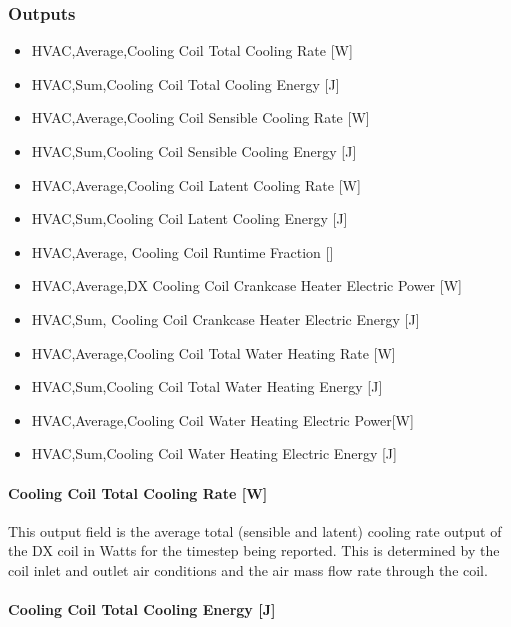 \subsubsection{Outputs}\label{outputs-24}

\begin{itemize}
\item
  HVAC,Average,Cooling Coil Total Cooling Rate {[}W{]}
\item
  HVAC,Sum,Cooling Coil Total Cooling Energy {[}J{]}
\item
  HVAC,Average,Cooling Coil Sensible Cooling Rate {[}W{]}
\item
  HVAC,Sum,Cooling Coil Sensible Cooling Energy {[}J{]}
\item
  HVAC,Average,Cooling Coil Latent Cooling Rate {[}W{]}
\item
  HVAC,Sum,Cooling Coil Latent Cooling Energy {[}J{]}
\item
  HVAC,Average, Cooling Coil Runtime Fraction {[]}
\item
  HVAC,Average,DX Cooling Coil Crankcase Heater Electric Power {[}W{]}
\item
  HVAC,Sum, Cooling Coil Crankcase Heater Electric Energy {[}J{]}
\item
  HVAC,Average,Cooling Coil Total Water Heating Rate {[}W{]}
\item
  HVAC,Sum,Cooling Coil Total Water Heating Energy {[}J{]}
\item
  HVAC,Average,Cooling Coil Water Heating Electric Power{[}W{]}
\item
  HVAC,Sum,Cooling Coil Water Heating Electric Energy {[}J{]}
\end{itemize}

\paragraph{Cooling Coil Total Cooling Rate {[}W{]}}\label{cooling-coil-total-cooling-rate-w-7}

This output field is the average total (sensible and latent) cooling rate output of the DX coil in Watts for the timestep being reported. This is determined by the coil inlet and outlet air conditions and the air mass flow rate through the coil.

\paragraph{Cooling Coil Total Cooling Energy {[}J{]}}\label{cooling-coil-total-cooling-energy-j-7}

